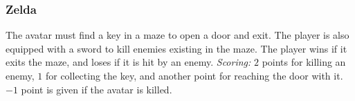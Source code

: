 \documentclass[conference]{IEEEtran}
\begin{document}
\subsubsection{Zelda} The avatar must find a key in a maze to open a door and exit. The player is also equipped with a sword to kill enemies existing in the maze. The player wins if it exits the maze, and loses if it is hit by an enemy. \textit{Scoring:} $2$ points for killing an enemy, $1$ for collecting the key, and another point for reaching the door with it. $-1$ point is given if the avatar is killed. 


\end{document}
